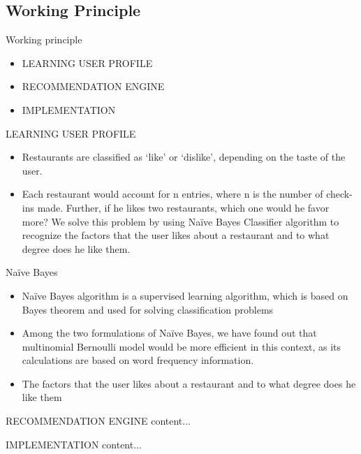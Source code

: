 \documentclass{if-beamer}
\begin{document}
\subsection{Working Principle}
\begin{frame}{Working principle }
	\begin{itemize}
		\item LEARNING USER PROFILE
		\item RECOMMENDATION ENGINE
		\item IMPLEMENTATION
	\end{itemize}
\end{frame}
\begin{frame}{LEARNING USER PROFILE}
	\begin{itemize}
		\item Restaurants are classified as ‘like’ or ‘dislike’, depending 
		on the taste of the user.
		\item Each 
		restaurant would account for n entries, where n is the number 
		of check-ins made. Further, if he likes two restaurants, which 
		one would he favor more? We solve this problem by using 
		Naïve Bayes Classifier algorithm to recognize the factors 
		that the user likes about a restaurant and to what degree does 
		he like them.
	\end{itemize}
	
	
\end{frame}
\begin{frame}{	Naïve Bayes}
	\begin{itemize}
		\item  Naïve Bayes algorithm is a supervised learning algorithm, which is based on Bayes theorem and used for solving classification problems
		\item Among the two formulations of Naïve Bayes, 
		we have found out that multinomial Bernoulli model would 
		be more efficient in this context, as its calculations are based 
		on word frequency information.
		\item The factors 
		that the user likes about a restaurant and to what degree does 
		he like them
	\end{itemize}

	\end{frame}
	
	\begin{frame}{RECOMMENDATION ENGINE}
	content...
	\end{frame}
	
	\begin{frame}{IMPLEMENTATION}
	content...
	\end{frame}
\end{document}
